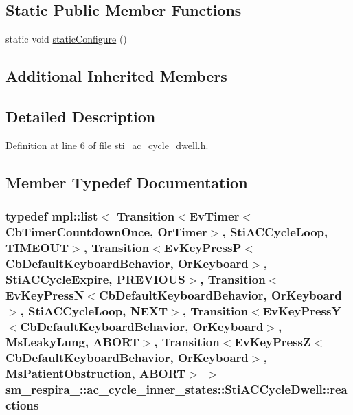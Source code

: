\subsection*{Static Public Member Functions}
\begin{DoxyCompactItemize}
\item 
static void \hyperlink{structsm__respira__1_1_1ac__cycle__inner__states_1_1StiACCycleDwell_a9b8f167470c70cc180a8abf704f9e8a0}{static\+Configure} ()
\end{DoxyCompactItemize}
\subsection*{Additional Inherited Members}


\subsection{Detailed Description}


Definition at line 6 of file sti\+\_\+ac\+\_\+cycle\+\_\+dwell.\+h.



\subsection{Member Typedef Documentation}
\subsubsection[{\texorpdfstring{reactions}{reactions}}]{\setlength{\rightskip}{0pt plus 5cm}typedef mpl\+::list$<$ Transition$<$Ev\+Timer$<$Cb\+Timer\+Countdown\+Once, {\bf Or\+Timer}$>$, {\bf Sti\+A\+C\+Cycle\+Loop}, {\bf T\+I\+M\+E\+O\+UT}$>$, Transition$<$Ev\+Key\+PressP$<$Cb\+Default\+Keyboard\+Behavior, {\bf Or\+Keyboard}$>$, {\bf Sti\+A\+C\+Cycle\+Expire}, {\bf P\+R\+E\+V\+I\+O\+US}$>$, Transition$<$Ev\+Key\+PressN$<$Cb\+Default\+Keyboard\+Behavior, {\bf Or\+Keyboard}$>$, {\bf Sti\+A\+C\+Cycle\+Loop}, {\bf N\+E\+XT}$>$, Transition$<$Ev\+Key\+PressY$<$Cb\+Default\+Keyboard\+Behavior, {\bf Or\+Keyboard}$>$, {\bf Ms\+Leaky\+Lung}, {\bf A\+B\+O\+RT}$>$, Transition$<$Ev\+Key\+PressZ$<$Cb\+Default\+Keyboard\+Behavior, {\bf Or\+Keyboard}$>$, {\bf Ms\+Patient\+Obstruction}, {\bf A\+B\+O\+RT}$>$ $>$ {\bf sm\+\_\+respira\+\_\+::ac\+\_\+cycle\+\_\+inner\+\_\+states\+::\+Sti\+A\+C\+Cycle\+Dwell\+::reactions}}\hypertarget{structsm__respira__1_1_1ac__cycle__inner__states_1_1StiACCycleDwell_ac7b785d83753f2a557af1ea316548944}{}\label{structsm__respira__1_1_1ac__cycle__inner__states_1_1StiACCycleDwell_ac7b785d83753f2a557af1ea316548944}


